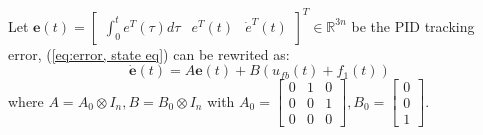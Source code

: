 \documentclass{ieeeaccess}
\newtheorem{remark}{Remark}
\begin{document}
Let $\pmb{e}(t)=\begin{bmatrix}
    \int_{0}^{t}e^T(\tau)d\tau & e^T(t) & \dot{e}^T(t)
\end{bmatrix}^T\in\mathbb{R}^{3n}$ be the PID tracking error, (\ref{eq:error, state eq}) can be rewrited as:
\begin{equation} \label{eq:linear f1}
    \dot{\pmb{e}}(t)=A\pmb{e}(t)+B(u_{fb}(t)+f_1(t))
\end{equation}
where $ A = A_0\otimes I_n, B = B_0\otimes I_n$
with $A_0 = \begin{bmatrix}
    0 & 1 & 0 \\ 0 & 0 & 1 \\ 0 & 0 & 0
\end{bmatrix}, B_0 = \begin{bmatrix}
0 \\ 0 \\ 1
\end{bmatrix}$. 
\end{document}

